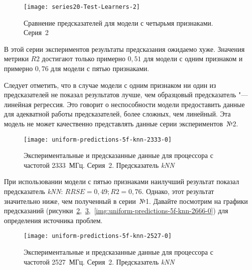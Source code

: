 \begin{figure}[H]
    \begin{center}
            \texttt{[image: series20-Test-Learners-2]}
            \caption{Сравнение предсказателей для модели с четырьмя признаками. Серия~2}
            \label{img:series20-Test-Learners-2}
    \end{center}
\end{figure}

В этой серии экспериментов результаты предсказания ожидаемо хуже. Значения метрики $R2$ достигают только примерно $0,51$ для модели с одним признаком и примерно $0,76$ для модели с пятью признаками.

Следует отметить, что в случае модели с одним признаком ни один из предсказателей не показал результатов лучше, чем образцовый предсказатель "--- линейная регрессия. Это говорит о неспособности модели предоставить данные для адекватной работы предсказателей, более сложных, чем линейный. Эта модель не может качественно представлять данные серии экспериментов~№2.

\begin{figure}[tbp]
    \begin{center}
        \texttt{[image: uniform-predictions-5f-knn-2333-0]}
        \caption{Экспериментальные и предсказанные данные для процессора с частотой 2333~МГц. Серия~2. Предсказатель \textit{kNN}}
        \label{img:uniform-predictions-5f-knn-2333-0}
    \end{center}
\end{figure}

При использовании модели с пятью признаками наилучший результат показал предсказатель \textit{kNN}: $RRSE = 0,49; R2 = 0,76$. Однако, этот результат значительно ниже, чем полученный в серии~№1. Давайте посмотрим на графики предсказаний (рисунки~\ref{img:uniform-predictions-5f-knn-2333-0},~\ref{img:uniform-predictions-5f-knn-2527-0},~\ref{img:uniform-predictions-5f-knn-2666-0}) для определения источника проблем.

\begin{figure}[tbp]
    \begin{center}
        \texttt{[image: uniform-predictions-5f-knn-2527-0]}
        \caption{Экспериментальные и предсказанные данные для процессора с частотой 2527~МГц. Серия~2. Предсказатель \textit{kNN}}
        \label{img:uniform-predictions-5f-knn-2527-0}
    \end{center}
\end{figure}

